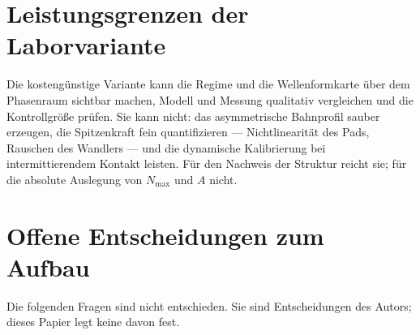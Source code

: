 \documentclass[12pt,a4paper]{report}
\begin{document}
\section{Leistungsgrenzen der Laborvariante}

Die kostengünstige Variante kann die Regime und die
Wellenformkarte über dem Phasenraum sichtbar machen, Modell und Messung
qualitativ vergleichen und die Kontrollgröße prüfen. Sie kann nicht:
das asymmetrische Bahnprofil sauber erzeugen, die Spitzenkraft fein
quantifizieren --- Nichtlinearität des Pads, Rauschen des Wandlers ---
und die dynamische Kalibrierung bei intermittierendem Kontakt leisten.
Für den Nachweis der Struktur reicht sie; für die absolute Auslegung von
$N_{\max}$ und $A$ nicht.

\section{Offene Entscheidungen zum Aufbau}
\label{sec:offene-entscheidungen}

Die folgenden Fragen sind nicht entschieden. Sie sind Entscheidungen des
Autors; dieses Papier legt keine davon fest.
\end{document}
